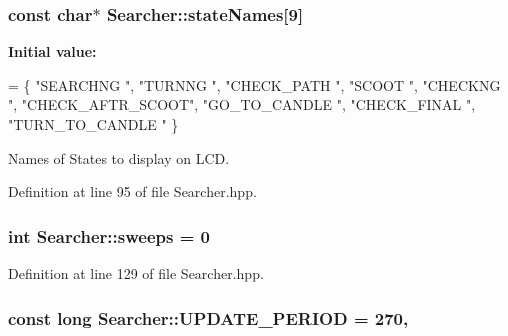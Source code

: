 \hypertarget{classSearcher_a2403bbf24da371ea9a31eeaec1f98b96}{
\subsubsection[{state\-Names}]{\setlength{\rightskip}{0pt plus 5cm}const char$\ast$ Searcher\-::state\-Names\mbox{[}9\mbox{]}\hspace{0.3cm}{\ttfamily [private]}}}\label{classSearcher_a2403bbf24da371ea9a31eeaec1f98b96}
{\bfseries Initial value\-:}
\begin{DoxyCode}
= \{
      \textcolor{stringliteral}{"SEARCHNG        "},
      \textcolor{stringliteral}{"TURNNG          "},
      \textcolor{stringliteral}{"CHECK\_PATH      "},
      \textcolor{stringliteral}{"SCOOT           "},
      \textcolor{stringliteral}{"CHECKNG         "},
      \textcolor{stringliteral}{"CHECK\_AFTR\_SCOOT"},
      \textcolor{stringliteral}{"GO\_TO\_CANDLE    "},
      \textcolor{stringliteral}{"CHECK\_FINAL     "},
      \textcolor{stringliteral}{"TURN\_TO\_CANDLE  "}
    \}
\end{DoxyCode}


Names of States to display on L\-C\-D. 



Definition at line 95 of file Searcher.\-hpp.

\hypertarget{classSearcher_af8a7e7ddce46577fca506e2f31aead60}{
\subsubsection[{sweeps}]{\setlength{\rightskip}{0pt plus 5cm}int Searcher\-::sweeps = 0\hspace{0.3cm}{\ttfamily [private]}}}\label{classSearcher_af8a7e7ddce46577fca506e2f31aead60}


Definition at line 129 of file Searcher.\-hpp.

\hypertarget{classSearcher_af4dd5850dbe46a9a76605ad4ba454066}{
\subsubsection[{U\-P\-D\-A\-T\-E\-\_\-\-P\-E\-R\-I\-O\-D}]{\setlength{\rightskip}{0pt plus 5cm}const long Searcher\-::\-U\-P\-D\-A\-T\-E\-\_\-\-P\-E\-R\-I\-O\-D = 270\hspace{0.3cm}{\ttfamily [static]}, {\ttfamily [private]}}}\label{classSearcher_af4dd5850dbe46a9a76605ad4ba454066}


